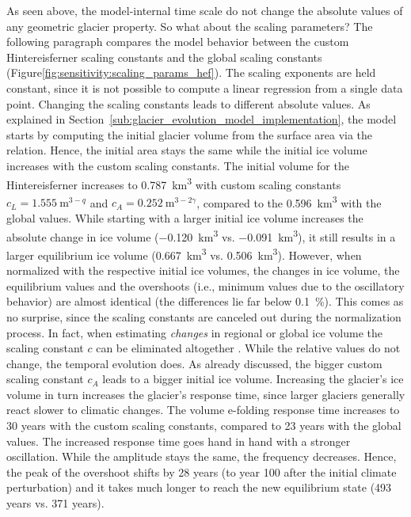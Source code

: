       As seen above, the model-internal time scale do not change the absolute values of any geometric glacier property. So what about the scaling parameters? The following paragraph compares the model behavior between the custom Hintereisferner scaling constants and the global scaling constants (Figure\ref{fig:sensitivity:scaling_params_hef}). The scaling exponents are held constant, since it is not possible to compute a linear regression from a single data point. %
      Changing the scaling constants leads to different absolute values. As explained in Section~\ref{sub:glacier_evolution_model_implementation}, the \vas{} model starts by computing the initial glacier volume from the surface area via the \vas{} relation. Hence, the initial area stays the same while the initial ice volume increases with the custom scaling constants. The initial volume for the Hintereisferner increases to \SI{0.787}{\cubic\kilo\meter} with custom scaling constants $c_L = \SI{1.555}{\meter^{3-q}}$ and $c_A = \SI{0.252}{\meter^{3-2\gamma}}$, compared to the \SI{0.596}{\cubic\kilo\meter} with the global values. While starting with a larger initial ice volume increases the absolute change in ice volume (\SI{-0.120}{\cubic\kilo\meter} vs. \SI{-0.091}{\cubic\kilo\meter}), it still results in a larger equilibrium ice volume (\SI{0.667}{\cubic\kilo\meter} vs. \SI{0.506}{\cubic\kilo\meter}). However, when normalized with the respective initial ice volumes, the changes in ice volume, the equilibrium values and the overshoots (i.e., minimum values due to the oscillatory behavior) are almost identical (the differences lie far below \SI{0.1}{\percent}). This comes as no surprise, since the scaling constants are canceled out during the normalization process. In fact, when estimating \emph{changes} in regional or global ice volume the scaling constant $c$ can be eliminated altogether \citep[][Section 8.5]{Bahr2015}. While the relative values do not change, the temporal evolution does. As already discussed, the bigger custom scaling constant $c_A$ leads to a bigger initial ice volume. Increasing the glacier's ice volume in turn increases the glacier's response time, since larger glaciers generally react slower to climatic changes. The volume e-folding response time increases to 30 years with the custom scaling constants, compared to 23 years with the global values. The increased response time goes hand in hand with a stronger oscillation. While the amplitude stays the same, the frequency decreases. Hence, the peak of the overshoot shifts by 28 years (to year 100 after the initial climate perturbation) and it takes much longer to reach the new equilibrium state (493 years vs. 371 years).
